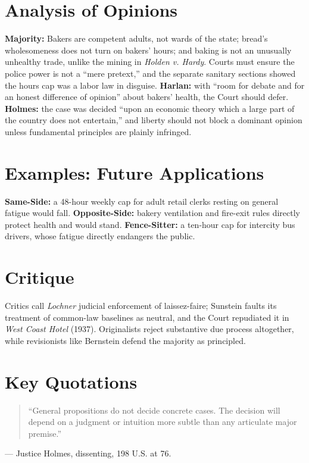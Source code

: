 \documentclass[12pt]{article}
\begin{document}
\section{Analysis of Opinions}
\textbf{Majority:} Bakers are competent adults, not wards of the state; bread's wholesomeness does not turn on bakers' hours; and baking is not an unusually unhealthy trade, unlike the mining in \textit{Holden v. Hardy}. Courts must ensure the police power is not a ``mere pretext,'' and the separate sanitary sections showed the hours cap was a labor law in disguise. \textbf{Harlan:} with ``room for debate and for an honest difference of opinion'' about bakers' health, the Court should defer. \textbf{Holmes:} the case was decided ``upon an economic theory which a large part of the country does not entertain,'' and liberty should not block a dominant opinion unless fundamental principles are plainly infringed.

\section{Examples: Future Applications}
\textbf{Same-Side:} a 48-hour weekly cap for adult retail clerks resting on general fatigue would fall. \textbf{Opposite-Side:} bakery ventilation and fire-exit rules directly protect health and would stand. \textbf{Fence-Sitter:} a ten-hour cap for intercity bus drivers, whose fatigue directly endangers the public.

\section{Critique}
Critics call \textit{Lochner} judicial enforcement of laissez-faire; Sunstein faults its treatment of common-law baselines as neutral, and the Court repudiated it in \textit{West Coast Hotel} (1937). Originalists reject substantive due process altogether, while revisionists like Bernstein defend the majority as principled.

\section{Key Quotations}
\begin{quote}
``General propositions do not decide concrete cases. The decision will depend on a judgment or intuition more subtle than any articulate major premise.''
\end{quote}
\noindent --- Justice Holmes, dissenting, 198 U.S. at 76.
\end{document}
